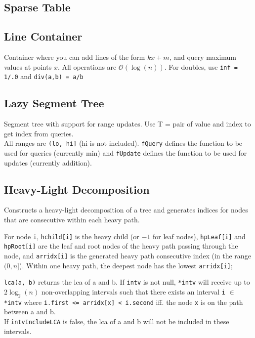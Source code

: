 \documentclass{article}
\begin{document}
\subsection*{Sparse Table}


\pagebreak

\subsection*{Line Container}
Container where you can add lines of the form $kx + m$, and query maximum values at points $x$.
All operations are $\mathcal{O}(\log(n))$. For doubles, use \lstinline{inf = 1/.0} and \lstinline{div(a,b) = a/b}
\begin{multicols}{2}

\end{multicols}

\subsection*{Lazy Segment Tree}
Segment tree with support for range updates. Use T = pair of value and index to get index from queries.\\
All ranges are \lstinline{(lo, hi]} (hi is not included).
\lstinline{fQuery} defines the function to be used for queries (currently min) and 
\lstinline{fUpdate} defines the function to be used for updates (currently addition).


\subsection*{Heavy-Light Decomposition}
Constructs a heavy-light decomposition of a tree and generates indices for nodes that are consecutive within each heavy path.

For node \lstinline{i}, \lstinline{hchild[i]} is the heavy child (or $-1$ for leaf nodes),
\lstinline{hpLeaf[i]} and \lstinline{hpRoot[i]} are the leaf and root nodes of the heavy path passing through the node,
and \lstinline{arridx[i]} is the generated heavy path consecutive index (in the range $(0,n]$).
Within one heavy path, the deepest node has the lowest \lstinline{arridx[i]};

\lstinline{lca(a, b)} returns the lca of a and b.
If \lstinline{intv} is not null, \lstinline{*intv} will receive up to $2\log_2(n)$ non-overlapping intervals
such that there exists an interval \lstinline{i} $\in$ \lstinline{*intv} where \lstinline{i.first <= arridx[x] < i.second} iff. the node \lstinline{x} is on the path between a and b.\\
If \lstinline{intvIncludeLCA} is false, the lca of a and b will not be included in these intervals.

\end{document}
